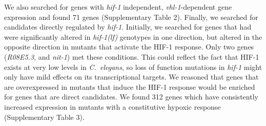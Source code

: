 \documentclass[9pt,twocolumn,twoside,lineno]{pnas-new}
\newcommand{\qval}[1]{$q<10^{-#1}$}
\newcommand{\cel}{\emph{C.~elegans}}
\newcommand{\gene}[1]{\emph{#1}}
\newcommand{\hif}{\emph{\mbox{hif-1(lf)}}}
\newcommand{\hifp}{HIF-1}
\newcommand{\vhltargets}{71} %
\newcommand{\hiftargets}{312}
\begin{document}
We also searched for genes with \gene{hif-1} independent, \gene{vhl-1}-dependent
gene expression and found \vhltargets{} genes (Supplementary Table 2). Finally,
we searched for candidates directly regulated by \gene{hif-1}. Initially, we
searched for genes that had were significantly altered in \hif{} genotypes in
one direction, but altered in the opposite direction in mutants that activate
the \hifp{} response. Only two genes (\emph{R08E5.3}, and \emph{nit-1}) met these
conditions. This could reflect the fact that \hifp{} exists at very low levels
in \cel{}, so loss of function mutations in \gene{hif-1} might only have mild
effects on its transcriptional targets. We reasoned that genes that are
overexpressed in mutants that induce the \hifp{} response would be enriched for
genes that are direct candidates. We found \hiftargets{}  genes which have
consistently increased expression in mutants with a constitutive hypoxic response
(Supplementary Table 3).

%
%
\end{document}
